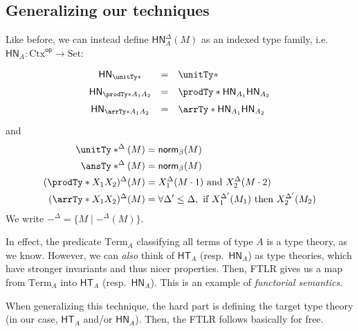 \documentclass[letterpaper]{article}
\newcommand{\De}[0]{\Delta}
\newcommand{\betaNorm}[1]{\mathsf{norm}_\beta(#1)}
\begin{document}
\subsection{Generalizing our techniques}

Like before, we can instead define $\mathsf{HN}_A^\De(M)$ as an indexed type family,
i.e.\ $\mathsf{HN}_A : \textrm{Ctx}^{\textsf{op}} \to \textrm{Set}$:
\[
\renewcommand{\arraystretch}{1.5}
\begin{array}{cll}
  \mathsf{HN}_{\unitTy*} & = & \unitTy* \\
  \mathsf{HN}_{\prodTy*{A_1}{A_2}} & = &
    \prodTy*{\mathsf{HN}_{A_1}}{\mathsf{HN}_{A_2}} \\
  \mathsf{HN}_{\arrTy*{A_1}{A_2}} & = &
    \arrTy*{\mathsf{HN}_{A_1}}{\mathsf{HN}_{A_2}}
\end{array}
\]
and
\begin{align*}
\unitTy*^\De(M) &= \betaNorm{M} \\
\ansTy*^\De(M) &= \betaNorm{M} \\
(\prodTy*{X_1}{X_2})^\De(M) &= X_1^\De(M \cdot 1) \textrm{ and } X_2^\De(M \cdot 2) \\
(\arrTy*{X_1}{X_2})^\De(M) &= \forall \De' \leq \De, \textrm{ if } X_1^{\De'}(M_1) \textrm{ then } X_2^{\De'}(M_2)
\end{align*}
We write $-^\De = \{ M \mid -^\De(M) \}$.

In effect, the predicate $\textrm{Term}_A$ classifying all terms of type $A$ is a type theory, as we know.
However, we can \emph{also} think of $\mathsf{HT}_A$ (resp.\
$\mathsf{HN}_A$) as type theories, which have stronger invariants and thus nicer
properties. Then, FTLR gives us a map from $\textrm{Term}_A$ into
$\mathsf{HT}_A$ (resp.\ $\mathsf{HN}_A$). This is an example of \emph{functorial
semantics}.

When generalizing this technique, the hard part is defining the target type
theory (in our case, $\mathsf{HT}_A$ and/or $\mathsf{HN}_A$). Then, the FTLR
follows basically for free.
\end{document}
